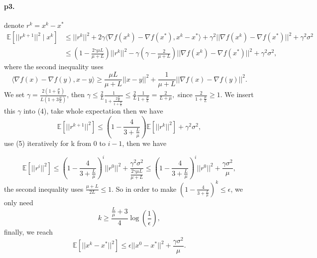 \documentclass[12pt,a4paper]{article}
\begin{document}
\paragraph{p3.}
denote $r^{k}=x^k-x^*$
\begin{equation}
	\begin{aligned}
		\mathbb{E}[||r^{k+1}||^2\mid x^k]&\leq||r^k||^2+2\gamma\langle \nabla f(x^k)-\nabla f(x^*),x^k-x^*\rangle+\gamma^2||\nabla f(x^k)-\nabla f(x^*)||^2+\gamma^2\sigma^2\\
		&\leq (1-\frac{2\gamma\mu L}{\mu+L})||r^k||^2-\gamma(\gamma-\frac{2}{\mu+L})||\nabla f(x^k)-\nabla f(x^*)||^2+\gamma^2\sigma^2,
	\end{aligned}
\end{equation}
where the second inequality uses 
\begin{equation*}
	\langle\nabla f(x)-\nabla f(y), x-y\rangle\geq \frac{\mu L}{\mu+L}||x-y||^2+\frac{1}{\mu+L}||\nabla f(x)-\nabla f(y)||^2.
\end{equation*}
 We set $\gamma =\frac{2(1+\frac{\mu}{L})}{L(1+3\frac{\mu}{L})}$, then $\gamma\leq \frac{2}{L}\frac{1}{1+\frac{2\frac{\mu}{L}}{1+\frac{\mu}{L}}}\leq \frac{2}{L}\frac{1}{1+\frac{\mu}{L}}=\frac{2}{L+\mu},$ since $\frac{2}{1+\frac{\mu}{L}}\geq 1$. We insert this $\gamma$ into (4), take whole expectation then we have 
 \begin{equation}
 	\mathbb{E}[||r^{k+1}||^2]\leq (1-\frac{4}{3+\frac{L}{\mu}})\mathbb{E}[||r^k||^2]+\gamma^2\sigma^2,
 \end{equation}
use (5) iteratively for k from 0 to $i-1$, then we have 

\begin{equation*}
	\mathbb{E}[||r^{i}||^2]\leq (1-\frac{4}{3+\frac{L}{\mu}})^i||r^0||^2+\frac{\gamma^2\sigma^2}{\frac{2\gamma \mu L}{\mu+L}}\leq (1-\frac{4}{3+\frac{L}{\mu}})^i||r^0||^2+\frac{\gamma\sigma^2}{\mu},
\end{equation*}
the second inequality uses $\frac{\mu+L}{2L}\leq 1.$ So in order to make  $(1-\frac{4}{3+\frac{L}{\mu}})^k\leq \epsilon$, we only need
\begin{equation*}
	k\geq \frac{\frac{L}{\mu}+3}{4}\log(\frac{1}{\epsilon}),
\end{equation*}
finally, we reach
\begin{equation*}
	\mathbb{E}[||x^k-x^*||^2]\leq \epsilon||x^0-x^*||^2+\frac{\gamma\sigma^2}{\mu}.
\end{equation*}
\end{document}

